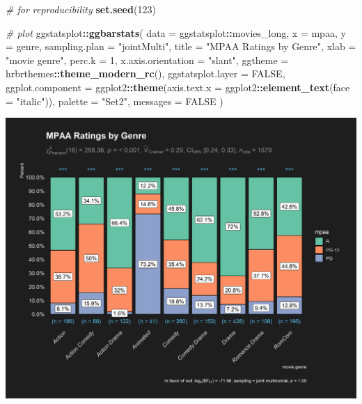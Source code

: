 \documentclass[
]{article}
\newenvironment{Shaded}{\begin{snugshade}}{\end{snugshade}}
\newcommand{\CommentTok}[1]{\textcolor[rgb]{0.56,0.35,0.01}{\textit{#1}}}
\newcommand{\DataTypeTok}[1]{\textcolor[rgb]{0.13,0.29,0.53}{#1}}
\newcommand{\DecValTok}[1]{\textcolor[rgb]{0.00,0.00,0.81}{#1}}
\newcommand{\KeywordTok}[1]{\textcolor[rgb]{0.13,0.29,0.53}{\textbf{#1}}}
\newcommand{\NormalTok}[1]{#1}
\newcommand{\OperatorTok}[1]{\textcolor[rgb]{0.81,0.36,0.00}{\textbf{#1}}}
\newcommand{\OtherTok}[1]{\textcolor[rgb]{0.56,0.35,0.01}{#1}}
\newcommand{\StringTok}[1]{\textcolor[rgb]{0.31,0.60,0.02}{#1}}
\begin{document}
\begin{Shaded}
\begin{Highlighting}[]
\CommentTok{\# for reproducibility}
\KeywordTok{set.seed}\NormalTok{(}\DecValTok{123}\NormalTok{)}

\CommentTok{\# plot}
\NormalTok{ggstatsplot}\OperatorTok{::}\KeywordTok{ggbarstats}\NormalTok{(}
  \DataTypeTok{data =}\NormalTok{ ggstatsplot}\OperatorTok{::}\NormalTok{movies\_long,}
  \DataTypeTok{x =}\NormalTok{ mpaa,}
  \DataTypeTok{y =}\NormalTok{ genre,}
  \DataTypeTok{sampling.plan =} \StringTok{"jointMulti"}\NormalTok{,}
  \DataTypeTok{title =} \StringTok{"MPAA Ratings by Genre"}\NormalTok{,}
  \DataTypeTok{xlab =} \StringTok{"movie genre"}\NormalTok{,}
  \DataTypeTok{perc.k =} \DecValTok{1}\NormalTok{,}
  \DataTypeTok{x.axis.orientation =} \StringTok{"slant"}\NormalTok{,}
  \DataTypeTok{ggtheme =}\NormalTok{ hrbrthemes}\OperatorTok{::}\KeywordTok{theme\_modern\_rc}\NormalTok{(),}
  \DataTypeTok{ggstatsplot.layer =} \OtherTok{FALSE}\NormalTok{,}
  \DataTypeTok{ggplot.component =}\NormalTok{ ggplot2}\OperatorTok{::}\KeywordTok{theme}\NormalTok{(}\DataTypeTok{axis.text.x =}\NormalTok{ ggplot2}\OperatorTok{::}\KeywordTok{element\_text}\NormalTok{(}\DataTypeTok{face =} \StringTok{"italic"}\NormalTok{)),}
  \DataTypeTok{palette =} \StringTok{"Set2"}\NormalTok{,}
  \DataTypeTok{messages =} \OtherTok{FALSE}
\NormalTok{)}
\end{Highlighting}
\end{Shaded}

\includegraphics[width=1\linewidth]{./figures/paper-ggbarstats1-1}
\end{document}

